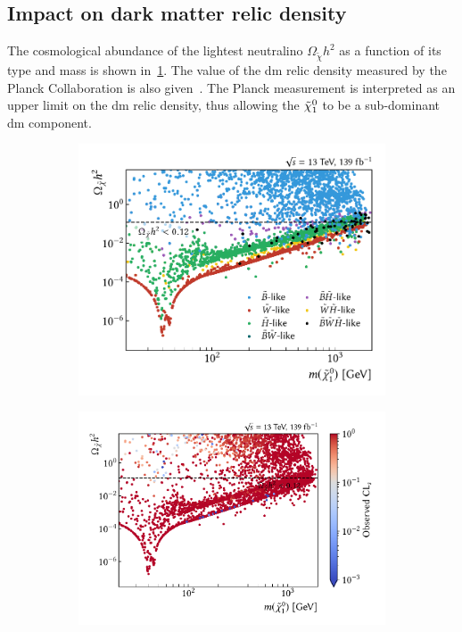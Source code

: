 \subsection{Impact on dark matter relic density}

The cosmological abundance of the lightest neutralino $\Omega_{\tilde{\chi}} h^2$ as a function of its type and mass is shown in~\cref{fig:relic_density_lsp}. The value of the \gls{dm} relic density measured by the Planck Collaboration is also given~\cite{Planck}. The Planck measurement is interpreted as an upper limit on the \gls{dm} relic density, thus allowing the $\tilde{\chi}_1^0$ to be a sub-dominant \gls{dm} component.

 \begin{figure}
	\captionsetup[subfigure]{aboveskip=-3pt,belowskip=0pt}
	\centering
	\begin{subfigure}[b]{0.458\linewidth}
		\centering\includegraphics[width=\textwidth]{scatter/relic_density_lsp}
		\caption{\label{fig:relic_density_lsp}}
	\end{subfigure}\hfill
	\begin{subfigure}[b]{0.542\linewidth}
		\centering\includegraphics[width=\textwidth]{scatter/relic_density_lsp_cls}

\end{subfigure}
\end{figure}
